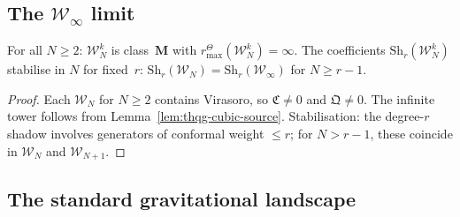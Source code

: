 
\subsection{The $\mathcal{W}_\infty$ limit}

\begin{proposition}
\ClaimStatusProvedHere
For all $N \geq 2$: $\mathcal{W}_N^k$ is class~$\mathbf{M}$
with \(r^\Theta_{\max}(\mathcal W_N^k)=\infty\). The coefficients
$\mathrm{Sh}_r(\mathcal{W}_N^k)$ stabilise in $N$ for fixed~$r$:
$\mathrm{Sh}_r(\mathcal{W}_N) = \mathrm{Sh}_r(\mathcal{W}_\infty)$
for $N \geq r - 1$.
\end{proposition}

\begin{proof}
Each $\mathcal{W}_N$ for $N \geq 2$ contains Virasoro,
so $\mathfrak{C} \neq 0$ and $\mathfrak{Q} \neq 0$.
The infinite tower follows from
Lemma~\ref{lem:thqg-cubic-source}.
Stabilisation: the degree-$r$ shadow involves generators of
conformal weight $\leq r$; for $N > r-1$, these coincide
in $\mathcal{W}_N$ and $\mathcal{W}_{N+1}$.
\end{proof}



\subsection{The standard gravitational landscape}

